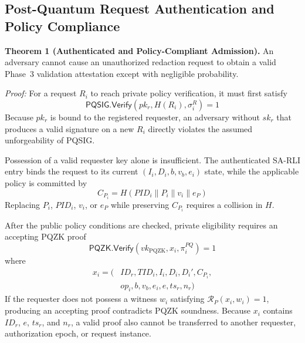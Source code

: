 \documentclass[lettersize,journal]{IEEEtran}
\begin{document}
    \subsection{Post-Quantum Request Authentication and Policy Compliance}
    
    \textbf{Theorem 1 (Authenticated and Policy-Compliant Admission).}
    An adversary cannot cause an unauthorized redaction request to obtain
    a valid Phase~3 validation attestation except with negligible
    probability.
    
    \emph{Proof:}
    For a request $R_i$ to reach private policy verification, it must
    first satisfy
    \begin{equation}
    \mathsf{PQSIG.Verify}
    (pk_r,H(R_i),\sigma_i^{R})=1
    \label{eq:sec_req_auth}
    \end{equation}
    Because $pk_r$ is bound to the registered requester, an adversary
    without $sk_r$ that produces a valid signature on a new $R_i$ directly
    violates the assumed unforgeability of PQSIG.
    
    Possession of a valid requester key alone is insufficient. The
    authenticated SA-RLI entry binds the request to its current
    $(I_i,D_i,b,v_b,e_i)$ state, while the applicable policy is committed
    by
    \begin{equation}
    {C_{P_i}=H(PID_i\parallel P_i\parallel v_i\parallel e_P)}
    \label{eq:sec_policy}
    \end{equation}
    Replacing $P_i$, $PID_i$, $v_i$, or  { $e_P$} while preserving  { $C_{P_i}$}
    requires a collision in $H$.
    
    After the public policy conditions are checked, private eligibility
    requires an accepting PQZK proof
    \begin{equation}
    \mathsf{PQZK.Verify}
    (vk_{\mathrm{PQZK}},x_i,\pi_i^{PQ})=1
    \label{eq:sec_zk_verify}
    \end{equation}
    where
    \begin{equation}
    { 
    \begin{aligned}
    x_i=\big(&ID_r,TID_i,I_i,D_i,D_i',C_{P_i},\\
    &op_i,b,v_b,e_i,e,ts_r,n_r\big)
    \end{aligned}}
    \label{eq:sec_zk_statement}
    \end{equation}
    If the requester does not possess a witness $w_i$ satisfying
    $\mathcal{R}_{P}(x_i,w_i)=1$, producing an accepting proof contradicts
    PQZK soundness.  {Because $x_i$ contains $ID_r$, $e$,
    $ts_r$, and $n_r$, a valid proof also cannot be transferred to another
    requester, authorization epoch, or request instance.}
    
\end{document}
